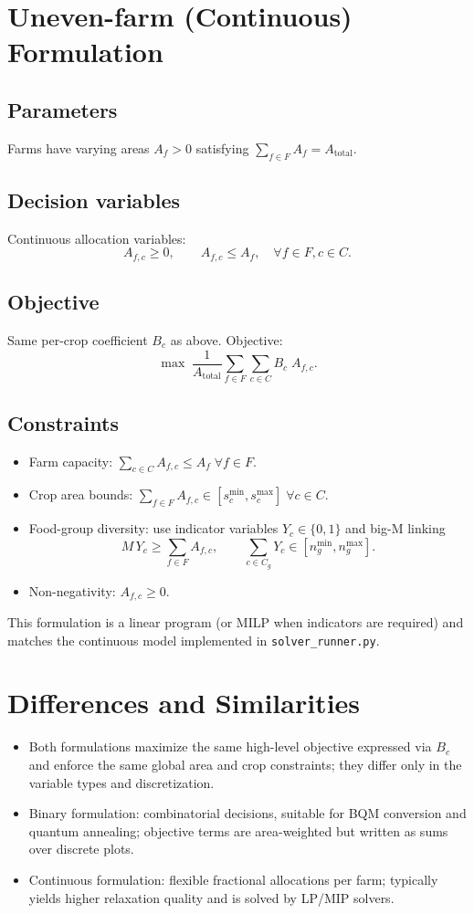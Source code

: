 \documentclass[11pt,a4paper]{article}
\begin{document}
\section{Uneven-farm (Continuous) Formulation}

\subsection{Parameters}
Farms have varying areas $A_f > 0$ satisfying $\sum_{f\in F} A_f = A_{\text{total}}$.

\subsection{Decision variables}
Continuous allocation variables:
\[ A_{f,c} \ge 0, \qquad A_{f,c} \le A_f, \quad \forall f\in F, c\in C. \]

\subsection{Objective}
Same per-crop coefficient $B_c$ as above. Objective:
\[ \max \; \frac{1}{A_{\text{total}}} \sum_{f\in F} \sum_{c\in C} B_c \; A_{f,c}. \]

\subsection{Constraints}
\begin{itemize}
    \item Farm capacity: $\sum_{c\in C} A_{f,c} \le A_f \; \forall f\in F$.
    \item Crop area bounds: $\sum_{f\in F} A_{f,c} \in [s_c^{\min}, s_c^{\max}] \; \forall c\in C$.
    \item Food-group diversity: use indicator variables $Y_c\in\{0,1\}$ and big-M linking
        \[ M\, Y_c \ge \sum_{f\in F} A_{f,c}, \qquad \sum_{c\in C_g} Y_c \in [n_g^{\min}, n_g^{\max}]. \]
    \item Non-negativity: $A_{f,c} \ge 0$.
\end{itemize}

This formulation is a linear program (or MILP when indicators are required) and matches the continuous model implemented in \texttt{solver\_runner.py}.

\section{Differences and Similarities}
\begin{itemize}
    \item Both formulations maximize the same high-level objective expressed via $B_c$ and enforce the same global area and crop constraints; they differ only in the variable types and discretization.
    \item Binary formulation: combinatorial decisions, suitable for BQM conversion and quantum annealing; objective terms are area-weighted but written as sums over discrete plots.
    \item Continuous formulation: flexible fractional allocations per farm; typically yields higher relaxation quality and is solved by LP/MIP solvers.
\end{itemize}
\end{document}
